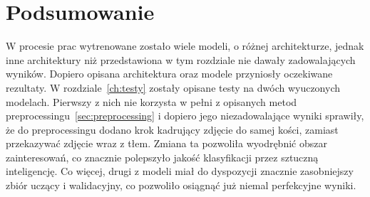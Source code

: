\section{Podsumowanie}\label{sec:podsumowanie}

W procesie prac wytrenowane zostało wiele modeli, o różnej architekturze, jednak inne architektury niż przedstawiona w tym rozdziale nie dawały zadowalających wyników.
Dopiero opisana architektura oraz modele przyniosły oczekiwane rezultaty.
W rozdziale~\ref{ch:testy} zostały opisane testy na dwóch wyuczonych modelach.
Pierwszy z nich nie korzysta w pełni z opisanych metod preprocessingu~\ref{sec:preprocessing} i dopiero jego niezadowalające wyniki sprawiły,
że do preprocessingu dodano krok kadrujący zdjęcie do samej kości, zamiast przekazywać zdjęcie wraz z tłem.
Zmiana ta pozwoliła wyodrębnić obszar zainteresowań, co znacznie polepszyło jakość klasyfikacji przez sztuczną inteligencję.
Co więcej, drugi z modeli miał do dyspozycji znacznie zasobniejszy zbiór uczący i walidacyjny, co pozwoliło osiągnąć już niemal perfekcyjne wyniki.


